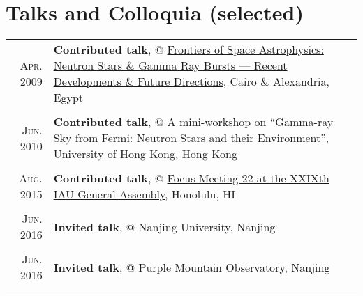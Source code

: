\documentclass[letterpaper,10pt]{article}
\begin{document}
\section{Talks and Colloquia (selected)}
\vspace{-0.8em}

\begingroup
\renewcommand\arraystretch{0.3}
\begin{longtable}{r|p{5.6in}}

    \textsc{Apr. 2009}   &   \textbf{Contributed talk}, @ \href{http://www.ns-grb.com/index0.html}{Frontiers of Space Astrophysics: Neutron Stars \& Gamma Ray Bursts --- Recent Developments \& Future Directions}, Cairo \& Alexandria, Egypt     \\
    \multicolumn{2}{c}{} \\

    \textsc{Jun. 2010}   &   \textbf{Contributed talk}, @ \href{http://www.physics.hku.hk/~astro/2010Astro/Index.htm}{A mini-workshop on ``Gamma-ray Sky from Fermi: Neutron Stars and their Environment''}, University of Hong Kong, Hong Kong   \\
    \multicolumn{2}{c}{} \\


    \textsc{Aug. 2015}   &   \textbf{Contributed talk}, @ \href{http://hffiau.epfl.ch/page-116896.html}{Focus Meeting 22 at the XXIXth IAU General Assembly}, Honolulu, HI     \\
    \multicolumn{2}{c}{} \\

    \textsc{Jun. 2016}   &   \textbf{Invited talk}, @ Nanjing University, Nanjing \\
    \multicolumn{2}{c}{} \\

    \textsc{Jun. 2016}   &   \textbf{Invited talk}, @ Purple Mountain Observatory, Nanjing \\
    \multicolumn{2}{c}{} \\


\end{longtable}
\end{document}

